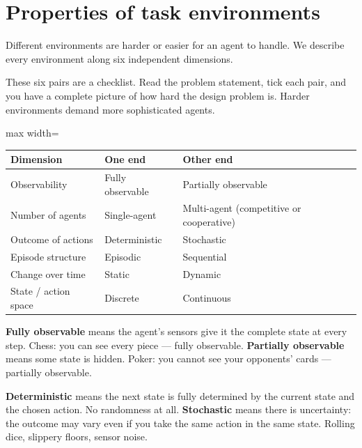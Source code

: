 \documentclass[a4paper,11pt]{article}
\begin{document}
\section{Properties of task environments}

Different environments are harder or easier for an agent to handle.
We describe every environment along six independent dimensions.

\begin{intuition}
These six pairs are a checklist. Read the problem statement, tick each
pair, and you have a complete picture of how hard the design problem is.
Harder environments demand more sophisticated agents.
\end{intuition}

\begin{adjustbox}{max width=\linewidth}
\begin{tabular}{@{}lll@{}}
\toprule
\textbf{Dimension} & \textbf{One end} & \textbf{Other end} \\
\midrule
Observability & Fully observable & Partially observable \\
Number of agents & Single-agent & Multi-agent (competitive or cooperative) \\
Outcome of actions & Deterministic & Stochastic \\
Episode structure & Episodic & Sequential \\
Change over time & Static & Dynamic \\
State / action space & Discrete & Continuous \\
\bottomrule
\end{tabular}
\end{adjustbox}

\medskip

\textbf{Fully observable} means the agent's sensors give it the complete
state at every step.
Chess: you can see every piece --- fully observable.
\textbf{Partially observable} means some state is hidden.
Poker: you cannot see your opponents' cards --- partially observable.

\textbf{Deterministic} means the next state is fully determined by the
current state and the chosen action.
No randomness at all.
\textbf{Stochastic} means there is uncertainty: the outcome may vary even
if you take the same action in the same state.
Rolling dice, slippery floors, sensor noise.
\end{document}
